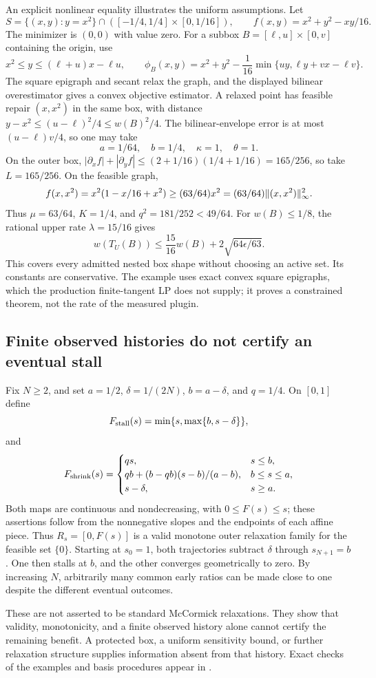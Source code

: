 An explicit nonlinear equality illustrates the uniform assumptions.
Let
\[
 S=\{(x,y):y=x^2\}\cap([-1/4,1/4]\times[0,1/16]),
 \qquad f(x,y)=x^2+y^2-xy/16.
\]
The minimizer is $(0,0)$ with value zero. For a subbox
$B=[\ell,u]\times[0,v]$ containing the origin, use
\[
 x^2\le y\le(\ell+u)x-\ell u,\qquad
 \phi_B(x,y)=x^2+y^2-\frac1{16}
              \min\{uy,\ell y+vx-\ell v\}.
\]
The square epigraph and secant relax the graph, and the displayed
bilinear overestimator gives a convex objective estimator. A relaxed
point has feasible repair $(x,x^2)$ in the same box, with distance
$y-x^2\le(u-\ell)^2/4\le w(B)^2/4$.
The bilinear-envelope error is at most $(u-\ell)v/4$, so one may take
\[
 a=1/64,\quad b=1/4,\quad\kappa=1,\quad\theta=1.
\]
On the outer box,
$|\partial_x f|+|\partial_y f|\le(2+1/16)(1/4+1/16)=165/256$,
so take $L=165/256$. On the feasible graph,
\[
 f(x,x^2)=x^2(1-x/16+x^2)\ge(63/64)x^2
        =(63/64)\lVert(x,x^2)\rVert_\infty^2.
\]
Thus $\mu=63/64$, $K=1/4$, and
$q^2=181/252<49/64$. For $w(B)\le1/8$, the rational upper rate
$\lambda=15/16$ gives
\[
 w(T_U(B))\le\frac{15}{16}w(B)+2\sqrt{64\epsilon/63}.
\]
This covers every admitted nested box shape without choosing an active
set. Its constants are conservative. The example uses exact convex
square epigraphs, which the production finite-tangent LP does not supply;
it proves a constrained theorem, not the rate of the measured plugin.

\subsection{Finite observed histories do not certify an eventual stall}

Fix $N\ge2$, and set $a=1/2$, $\delta=1/(2N)$, $b=a-\delta$,
and $q=1/4$. On $[0,1]$ define
\[
 F_{\rm stall}(s)=\min\{s,\max\{b,s-\delta\}\},
\]
and
\[
 F_{\rm shrink}(s)=
 \begin{cases}
 qs,&s\le b,\\
 qb+(b-qb)(s-b)/(a-b),&b\le s\le a,\\
 s-\delta,&s\ge a.
 \end{cases}
\]
Both maps are continuous and nondecreasing, with $0\le F(s)\le s$;
these assertions follow from the nonnegative slopes and the endpoints
of each affine piece. Thus $R_s=[0,F(s)]$ is a valid monotone outer
relaxation family for the feasible set $\{0\}$.
Starting at $s_0=1$, both trajectories subtract $\delta$ through
$s_{N+1}=b$. One then stalls at $b$, and the other converges
geometrically to zero. By increasing $N$, arbitrarily many common early
ratios can be made close to one despite the different eventual outcomes.

These are not asserted to be standard McCormick relaxations. They show
that validity, monotonicity, and a finite observed history alone cannot
certify the remaining benefit. A protected box, a uniform sensitivity
bound, or further relaxation structure supplies information absent from
that history. Exact checks of the examples and basis procedures appear
in .
